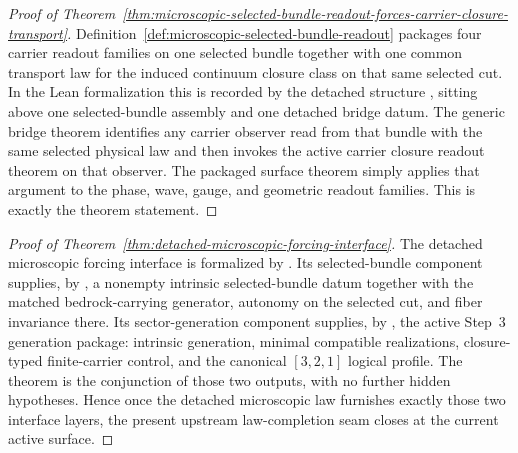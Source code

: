 \begin{proof}[Proof of Theorem~\ref{thm:microscopic-selected-bundle-readout-forces-carrier-closure-transport}]
\label{proof:thm:microscopic-selected-bundle-readout-forces-carrier-closure-transport}
Definition~\ref{def:microscopic-selected-bundle-readout} packages four carrier
readout families on one selected bundle together with one common transport law
for the induced continuum closure class on that same selected cut. In the Lean
formalization this is recorded by the detached structure
, sitting above one selected-bundle assembly
and one detached bridge datum. The generic bridge theorem
 identifies any
carrier observer read from that bundle with the same selected physical law and
then invokes the active carrier closure readout theorem on that observer. The
packaged surface theorem 
simply applies that argument to the phase, wave, gauge, and geometric readout
families. This is exactly the theorem statement.
\end{proof}

\begin{proof}[Proof of Theorem~\ref{thm:detached-microscopic-forcing-interface}]
\label{proof:thm:detached-microscopic-forcing-interface}
The detached microscopic forcing interface is formalized by
. Its selected-bundle component
 supplies, by
, a nonempty intrinsic
selected-bundle datum together with the matched bedrock-carrying generator,
autonomy on the selected cut, and fiber invariance there. Its sector-generation
component supplies, by
, the active Step~3
generation package: intrinsic generation, minimal compatible realizations,
closure-typed finite-carrier control, and the canonical \([3,2,1]\) logical
profile. The theorem  is the conjunction of
those two outputs, with no further hidden hypotheses. Hence once the detached
microscopic law furnishes exactly those two interface layers, the present
upstream law-completion seam closes at the current active surface.
\end{proof}

